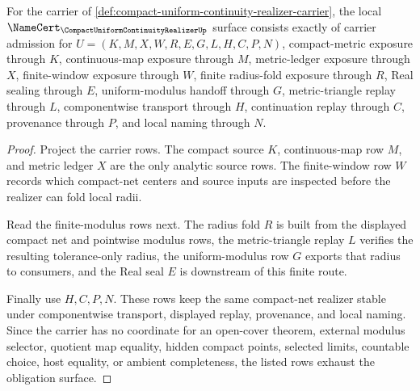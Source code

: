 \begin{theorem}
\label{thm:compact-uniform-continuity-realizer-namecert-obligations}
For the carrier of \autoref{def:compact-uniform-continuity-realizer-carrier}, the local $\NameCert_{\CompactUniformContinuityRealizerUp}$ surface consists exactly of carrier admission for $U=(K,M,X,W,R,E,G,L,H,C,P,N)$, compact-metric exposure through $K$, continuous-map exposure through $M$, metric-ledger exposure through $X$, finite-window exposure through $W$, finite radius-fold exposure through $R$, Real sealing through $E$, uniform-modulus handoff through $G$, metric-triangle replay through $L$, componentwise transport through $H$, continuation replay through $C$, provenance through $P$, and local naming through $N$.
\end{theorem}
\begin{proof}
Project the carrier rows. The compact source $K$, continuous-map row $M$, and metric ledger $X$ are the only analytic source rows. The finite-window row $W$ records which compact-net centers and source inputs are inspected before the realizer can fold local radii.

Read the finite-modulus rows next. The radius fold $R$ is built from the displayed compact net and pointwise modulus rows, the metric-triangle replay $L$ verifies the resulting tolerance-only radius, the uniform-modulus row $G$ exports that radius to consumers, and the Real seal $E$ is downstream of this finite route.

Finally use $H,C,P,N$. These rows keep the same compact-net realizer stable under componentwise transport, displayed replay, provenance, and local naming. Since the carrier has no coordinate for an open-cover theorem, external modulus selector, quotient map equality, hidden compact points, selected limits, countable choice, host equality, or ambient completeness, the listed rows exhaust the obligation surface.
\end{proof}

